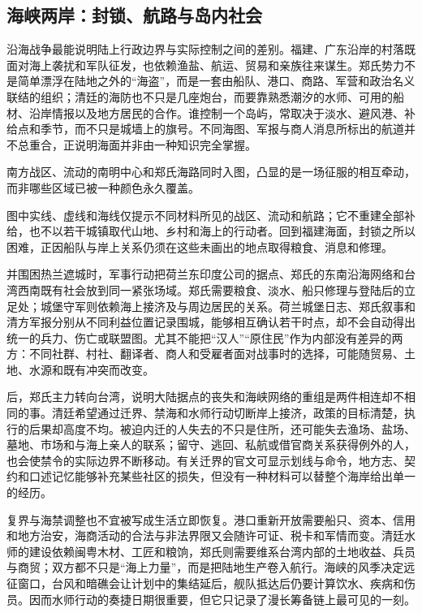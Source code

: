 \subsection*{海峡两岸：封锁、航路与岛内社会}
沿海战争最能说明陆上行政边界与实际控制之间的差别。福建、广东沿岸的村落既面对海上袭扰和军队征发，也依赖渔盐、航运、贸易和亲族往来谋生。郑氏势力不是简单漂浮在陆地之外的“海盗”，而是一套由船队、港口、商路、军营和政治名义联结的组织；清廷的海防也不只是几座炮台，而要靠熟悉潮汐的水师、可用的船材、沿岸情报以及地方居民的合作。谁控制一个岛屿，常取决于淡水、避风港、补给点和季节，而不只是城墙上的旗号。不同海图、军报与商人消息所标出的航道并不总重合，正说明海面并非由一种知识完全掌握。

\noindent 南方战区、流动的南明中心和郑氏海路同时入图，凸显的是一场征服的相互牵动，而非哪些区域已被一种颜色永久覆盖。

图中实线、虚线和海线仅提示不同材料所见的战区、流动和航路；它不重建全部补给，也不以若干城镇取代山地、乡村和海上的行动者。回到福建海面，封锁之所以困难，正因船队与岸上关系仍须在这些未画出的地点取得粮食、消息和修理。

并围困热兰遮城时，军事行动把荷兰东印度公司的据点、郑氏的东南沿海网络和台湾西南既有社会放到同一紧张场域。郑氏需要粮食、淡水、船只修理与登陆后的立足处；城堡守军则依赖海上接济及与周边居民的关系。荷兰城堡日志、郑氏叙事和清方军报分别从不同利益位置记录围城，能够相互确认若干时点，却不会自动得出统一的兵力、伤亡或联盟图。尤其不能把“汉人”“原住民”作为内部没有差异的两方：不同社群、村社、翻译者、商人和受雇者面对战事时的选择，可能随贸易、土地、水源和既有冲突而改变。

后，郑氏主力转向台湾，说明大陆据点的丧失和海峡网络的重组是两件相连却不相同的事。清廷希望通过迁界、禁海和水师行动切断岸上接济，政策的目标清楚，执行的后果却高度不均。被迫内迁的人失去的不只是住所，还可能失去渔场、盐场、墓地、市场和与海上亲人的联系；留守、逃回、私航或借官商关系获得例外的人，也会使禁令的实际边界不断移动。有关迁界的官文可显示划线与命令，地方志、契约和口述记忆能够补充某些社区的损失，但没有一种材料可以替整个海岸给出单一的经历。

复界与海禁调整也不宜被写成生活立即恢复。港口重新开放需要船只、资本、信用和地方治安，海商活动的合法与非法界限又会随许可证、税卡和军情而变。清廷水师的建设依赖闽粤木材、工匠和粮饷，郑氏则需要维系台湾内部的土地收益、兵员与商贸；双方都不只是“海上力量”，而是把陆地生产卷入航行。海峡的风季决定远征窗口，台风和暗礁会让计划中的集结延后，舰队抵达后仍要计算饮水、疾病和伤员。因而水师行动的奏捷日期很重要，但它只记录了漫长筹备链上最可见的一刻。


